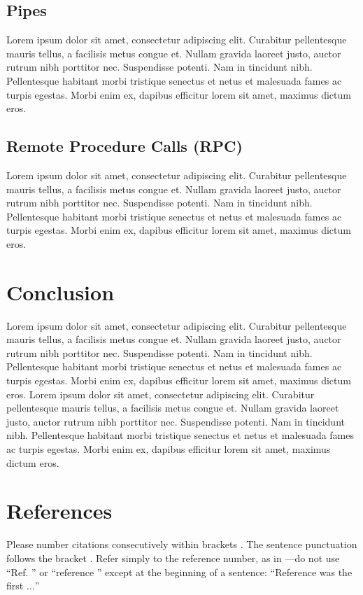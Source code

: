 \documentclass[conference, 12pt]{IEEEtran}
\begin{document}
\subsection{Pipes}
Lorem ipsum dolor sit amet, consectetur adipiscing elit. Curabitur pellentesque mauris tellus, a facilisis metus congue et. Nullam gravida laoreet justo, auctor rutrum nibh porttitor nec. Suspendisse potenti. Nam in tincidunt nibh. Pellentesque habitant morbi tristique senectus et netus et malesuada fames ac turpis egestas. Morbi enim ex, dapibus efficitur lorem sit amet, maximus dictum eros. 

\subsection{Remote Procedure Calls (RPC)}
Lorem ipsum dolor sit amet, consectetur adipiscing elit. Curabitur pellentesque mauris tellus, a facilisis metus congue et. Nullam gravida laoreet justo, auctor rutrum nibh porttitor nec. Suspendisse potenti. Nam in tincidunt nibh. Pellentesque habitant morbi tristique senectus et netus et malesuada fames ac turpis egestas. Morbi enim ex, dapibus efficitur lorem sit amet, maximus dictum eros. 

\section{Conclusion}
Lorem ipsum dolor sit amet, consectetur adipiscing elit. Curabitur pellentesque mauris tellus, a facilisis metus congue et. Nullam gravida laoreet justo, auctor rutrum nibh porttitor nec. Suspendisse potenti. Nam in tincidunt nibh. Pellentesque habitant morbi tristique senectus et netus et malesuada fames ac turpis egestas. Morbi enim ex, dapibus efficitur lorem sit amet, maximus dictum eros. Lorem ipsum dolor sit amet, consectetur adipiscing elit. Curabitur pellentesque mauris tellus, a facilisis metus congue et. Nullam gravida laoreet justo, auctor rutrum nibh porttitor nec. Suspendisse potenti. Nam in tincidunt nibh. Pellentesque habitant morbi tristique senectus et netus et malesuada fames ac turpis egestas. Morbi enim ex, dapibus efficitur lorem sit amet, maximus dictum eros. 

\section*{References}

Please number citations consecutively within brackets \cite{b1}. The 
sentence punctuation follows the bracket \cite{b2}. Refer simply to the reference 
number, as in \cite{b3}---do not use ``Ref. \cite{b3}'' or ``reference \cite{b3}'' except at 
the beginning of a sentence: ``Reference \cite{b3} was the first $\ldots$''
\end{document}
